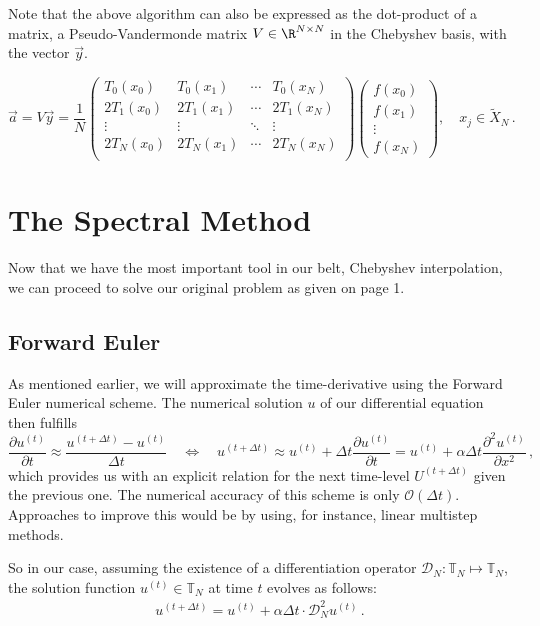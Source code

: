 \documentclass[12pt, a4paper]{article}
\begin{document}
  Note that the above algorithm can also be expressed as the dot-product of a matrix, a Pseudo-Vandermonde matrix $V \in \R^{N\times N}$ in the Chebyshev basis, with the vector $\vec{y}$.

  $$\vec{a} = V \vec{y} = \frac{1}{N} \begin{pmatrix}
      T_0(x_0)  & T_0(x_1)  & \cdots & T_0(x_N)  \\
      2T_1(x_0) & 2T_1(x_1) & \cdots & 2T_1(x_N) \\
      \vdots    & \vdots    & \ddots & \vdots    \\
      2T_N(x_0) & 2T_N(x_1) & \cdots & 2T_N(x_N) \\
    \end{pmatrix} \begin{pmatrix}
      f(x_0) \\
      f(x_1) \\
      \vdots \\
      f(x_N)
    \end{pmatrix}, \quad x_j \in \tilde{X}_N \,.$$


  \section{The Spectral Method}
  Now that we have the most important tool in our belt, Chebyshev interpolation, we can proceed to solve our original problem as given on page 1.

  \subsection{Forward Euler}
  As mentioned earlier, we will approximate the time-derivative using the Forward Euler numerical scheme.
  The numerical solution $u$ of our differential equation then fulfills
  $$\frac{\partial u^{(t)}}{\partial t} \approx \frac{u^{(t+\Delta t)} - u^{(t)}}{\Delta t} \quad\Leftrightarrow\quad u^{(t+\Delta t)} \approx u^{(t)} + \Delta t \frac{\partial u^{(t)}}{\partial t} = u^{(t)} + \alpha \Delta t \frac{\partial^2 u^{(t)}}{\partial x^2} \,,$$
  which provides us with an explicit relation for the next time-level $U^{(t+\Delta t)}$ given the previous one.
  The numerical accuracy of this scheme is only $\mathcal{O}(\Delta t)$.
  Approaches to improve this would be by using, for instance, linear multistep methods.

  So in our case, assuming the existence of a differentiation operator $\mathcal{D}_N: \mathbb{T}_N \mapsto \mathbb{T}_N$, the solution function $u^{(t)} \in \mathbb{T}_N$ at time $t$ evolves as follows:
  \begin{align*}
    u^{(t+\Delta t)} = u^{(t)} + \alpha \Delta t \cdot \mathcal{D}_N^2 u^{(t)} \,.
  \end{align*}
\end{document}

